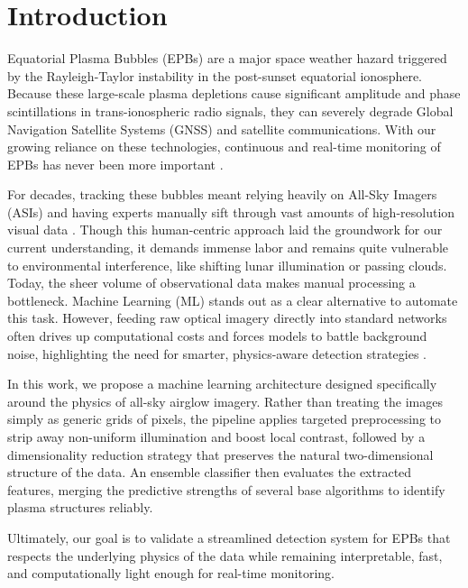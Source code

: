 \chapter{Introduction}\label{chap:introduction}

Equatorial Plasma Bubbles (EPBs) are a major space weather hazard triggered by the Rayleigh-Taylor instability in the post-sunset equatorial ionosphere. Because these large-scale plasma depletions cause significant amplitude and phase scintillations in trans-ionospheric radio signals, they can severely degrade Global Navigation Satellite Systems (GNSS) and satellite communications. With our growing reliance on these technologies, continuous and real-time monitoring of EPBs has never been more important \cite{zhong2025automatic,okoh2025bootstrapping,githio2024machine}.

For decades, tracking these bubbles meant relying heavily on All-Sky Imagers (ASIs) and having experts manually sift through vast amounts of high-resolution visual data \cite{okoh2025bootstrapping,zhong2025automatic}. Though this human-centric approach laid the groundwork for our current understanding, it demands immense labor and remains quite vulnerable to environmental interference, like shifting lunar illumination or passing clouds. Today, the sheer volume of observational data makes manual processing a bottleneck. Machine Learning (ML) stands out as a clear alternative to automate this task. However, feeding raw optical imagery directly into standard networks often drives up computational costs and forces models to battle background noise, highlighting the need for smarter, physics-aware detection strategies \cite{githio2024machine}.

In this work, we propose a machine learning architecture designed specifically around the physics of all-sky airglow imagery. Rather than treating the images simply as generic grids of pixels, the pipeline applies targeted preprocessing to strip away non-uniform illumination and boost local contrast, followed by a dimensionality reduction strategy that preserves the natural two-dimensional structure of the data. An ensemble classifier then evaluates the extracted features, merging the predictive strengths of several base algorithms to identify plasma structures reliably.

Ultimately, our goal is to validate a streamlined detection system for EPBs that respects the underlying physics of the data while remaining interpretable, fast, and computationally light enough for real-time monitoring.

